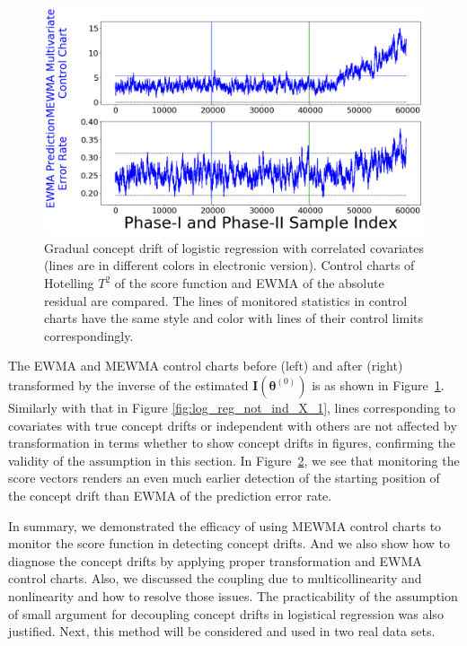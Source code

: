 \documentclass[twoside,11pt]{article}
\begin{document}
\begin{enumerate}[(I)]
\begin{figure}[!htbp]
  \label{fig:log_reg_not_ind_X_grad_cd}
\end{figure}
\begin{figure}[!htbp]
\centering
\includegraphics[width = 0.6\linewidth]{../figures/v14/sim_7/logi_small/1_sim7_logi_1e-08_0_005_1.png}
  \caption{Gradual concept drift of logistic regression with correlated covariates (lines are in different colors in electronic version). Control charts of Hotelling $T^2$ of the score function and EWMA of the absolute residual are compared. The lines of monitored statistics in control charts have the same style and color with lines of their control limits correspondingly.}
  \label{fig:log_reg_ind_X_grad_cd_comp}
\end{figure}

The EWMA and MEWMA control charts before (left) and after (right) transformed by {the inverse of the estimated} ${\mathbf {I}}(\bm { \theta}^{(0)})$ is as shown in Figure~\ref{fig:log_reg_not_ind_X_grad_cd}. Similarly with that in Figure \ref{fig:log_reg_not_ind_X_1}, lines corresponding to covariates with true concept drifts or independent with others are not affected by transformation in terms whether to show concept drifts in figures, confirming the validity of the assumption in this section. In Figure~\ref{fig:log_reg_ind_X_grad_cd_comp}, we see that monitoring the score vectors renders an even much earlier detection of the starting position of the concept drift than EWMA of the prediction error rate.

In summary, we demonstrated the efficacy of using MEWMA control charts to monitor the score function in detecting concept drifts. And we also show how to diagnose the concept drifts by applying proper transformation and EWMA control charts. Also, we discussed the coupling due to multicollinearity and nonlinearity and how to resolve those issues. The practicability of the assumption of small argument for decoupling concept drifts in logistical regression was also justified. Next, this method will be considered and used in two real data sets.
\end{enumerate}
\end{document}
